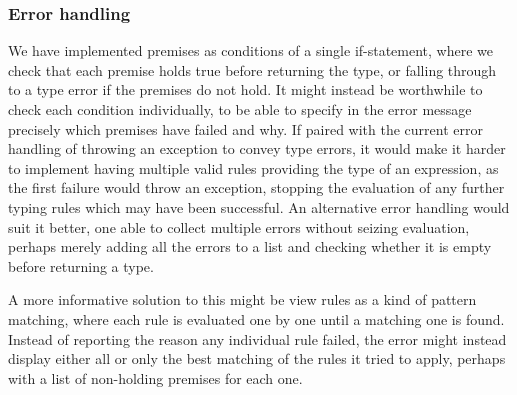 \documentclass[nofilelist]{cslthse-msc}
\newcommand{\CR}[1]{\textcolor{green!60!black}{[\textbf{CR}:#1]}}
\begin{document}

\subsubsection{Error handling}
We have implemented premises as conditions of a single if-statement, where we check that each premise holds true before returning the type, or falling through to a type error if the premises do not hold.
It might instead be worthwhile to check each condition individually, to be able to specify in the error message precisely which premises have failed and why.
If paired with the current error handling of throwing an exception to convey type errors, it would make it harder to implement having multiple valid rules providing the type of an expression, as the first failure would throw an exception, stopping the evaluation of any further typing rules which may have been successful.
An alternative error handling would suit it better, one able to collect multiple errors without seizing evaluation, perhaps merely adding all the errors to a list and checking whether it is empty before returning a type.

A more informative solution to this might be view rules as a kind of pattern matching, where each rule is evaluated one by one until a matching one is found.
Instead of reporting the reason any individual rule failed, the error might instead display either all or only the best matching of the rules it tried to apply, perhaps with a list of non-holding premises for each one.
%
\end{document}
